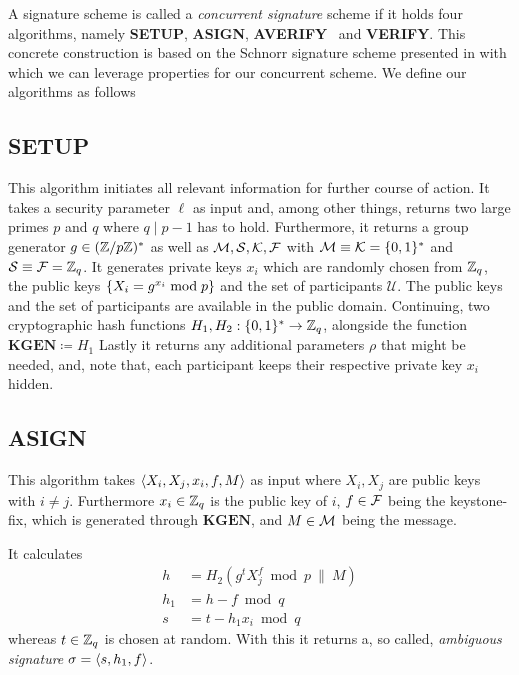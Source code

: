 A signature scheme is called a \textit{concurrent signature} scheme if it holds four algorithms, namely \textbf{SETUP}, \textbf{ASIGN}, \textbf{AVERIFY}~ and \textbf{VERIFY}.
This concrete construction is based on the Schnorr signature scheme presented in \cite{schnorr1991efficient} with which we can leverage properties for our concurrent scheme.
We define our algorithms as follows
   
\subsection{\textbf{SETUP}}
  This algorithm initiates all relevant information for further course of action.
  It takes a security parameter \(\ell\) as input and, among other things, returns two large primes \(p\) and \(q\) where \(q \mid p-1\) has to hold.
  Furthermore, it returns a group generator \(g\in(\mathbb{Z}/p\mathbb{Z})^\ast\) as well as \(\mathcal{M}, \mathcal{S}, \mathcal{K}, \mathcal{F}\) with \(\mathcal{M} \equiv \mathcal{K} =  \{ 0,1 \}^\ast\) and \(\mathcal{S} \equiv \mathcal{F} = \mathbb{Z}_q\).
  It generates private keys \(x_i\) which are randomly chosen from \(\mathbb{Z}_q\), the public keys \( \{ X_i = g^{x_i} \bmod p \}\) and the set of participants \(\mathcal{U}\).
  The public keys and the set of participants are available in the public domain.
  Continuing, two cryptographic hash functions \(H_1, H_2:  \{ 0,1 \}^\ast \to \mathbb{Z}_q\), alongside the function \(\textbf{KGEN} \coloneqq H_1\)
  Lastly it returns any additional parameters \(\rho\) that might be needed, and, note that, each participant keeps their respective private key \(x_i\) hidden. 

\subsection{\textbf{ASIGN}}
  This algorithm takes \(\langle X_i, X_j, x_i, f, M \rangle\) as input where \(X_i, X_j\) are public keys with \(i\neq j\).
  Furthermore \(x_i\in\mathbb{Z}_q\) is the public key of \(i\), \(f\in\mathcal{F}\) being the keystone-fix, which is generated through \(\textbf{KGEN}\), and \(M\in\mathcal{M}\) being the message.
  
  It calculates
    \begin{align*}
      h &= H_2(g^t X_j^f \bmod p ~\|~ M)\\
      h_1 &= h - f \bmod q\\
      s &= t - h_1 x_i \bmod q
    \end{align*}
  whereas \(t\in \mathbb{Z}_q\) is chosen at random.
  With this it returns a, so called, \textit{ambiguous signature} \(\sigma=\langle s, h_1, f \rangle\).

